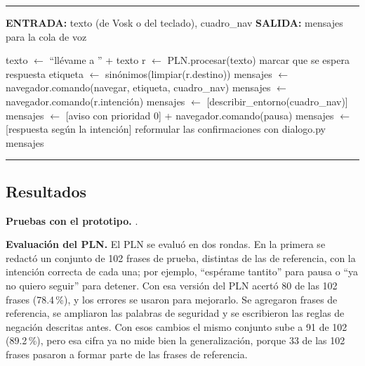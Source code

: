 \begin{center}
\label{alg:dev_inter}
\end{center}
\vspace{-1.8cm}
\rule{\textwidth}{0.4pt}
\vspace{-0.9cm}
\begin{algorithmic}[1]

\Statex \textbf{ENTRADA:} texto (de Vosk o del teclado), cuadro\_nav
\Statex \textbf{SALIDA:} mensajes para la cola de voz

\Statex
{}
    \State \Return [despedida]
\EndIf
{}
    \State texto $\gets$ ``llévame a '' + texto
\EndIf
\State r $\gets$ PLN.procesar(texto)
        \State marcar que se espera respuesta
        \State {}
    \EndIf
    \State etiqueta $\gets$ sinónimos(limpiar(r.destino))
    \State mensajes $\gets$ navegador.comando(navegar, etiqueta, cuadro\_nav)
    \State mensajes $\gets$ navegador.comando(r.intención)
    \State mensajes $\gets$ [describir\_entorno(cuadro\_nav)]
    \State mensajes $\gets$ [aviso con prioridad 0] + navegador.comando(pausa)
\Else
    \State mensajes $\gets$ [respuesta según la intención]
\EndIf
{}
    \State reformular las confirmaciones con dialogo.py
\EndIf
\State \Return mensajes

\end{algorithmic}
\vspace{-0.9cm}
\rule{\textwidth}{0.4pt}

\subsection{Resultados}

\textbf{Pruebas con el prototipo.} .

\textbf{Evaluación del PLN.} El PLN se evaluó en dos rondas. En la primera se redactó un
conjunto de 102 frases de prueba, distintas de las de referencia, con la intención
correcta de cada una; por ejemplo, ``espérame tantito'' para pausa o ``ya no quiero
seguir'' para detener. Con esa versión del PLN acertó 80 de las 102 frases (78.4\,\%), y
los errores se usaron para mejorarlo. Se agregaron frases de referencia, se ampliaron las
palabras de seguridad y se escribieron las reglas de negación descritas antes. Con esos
cambios el mismo conjunto sube a 91 de 102 (89.2\,\%), pero esa cifra ya no mide bien la
generalización, porque 33 de las 102 frases pasaron a formar parte de las frases de
referencia.

